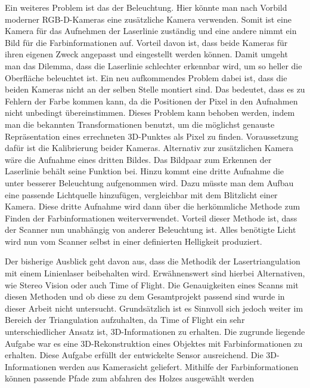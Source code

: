 	Ein weiteres Problem ist das der Beleuchtung. Hier könnte man nach Vorbild moderner RGB-D-Kameras eine zusätzliche Kamera verwenden. Somit ist eine Kamera für das Aufnehmen der Laserlinie zuständig und eine andere nimmt ein Bild für die Farbinformationen auf. Vorteil davon ist, dass beide Kameras für ihren eigenen Zweck angepasst und eingestellt werden können. Damit umgeht man das Dilemma, dass die Laserlinie schlechter erkennbar wird, um so heller die Oberfläche beleuchtet ist. Ein neu aufkommendes Problem dabei ist, dass die beiden Kameras nicht an der selben Stelle montiert sind. Das bedeutet, dass es zu Fehlern der Farbe kommen kann, da die Positionen der Pixel in den Aufnahmen nicht unbedingt übereinstimmen. Dieses Problem kann behoben werden, indem man die bekannten Transformationen benutzt, um die möglichst genauste Repräsentation eines errechneten 3D-Punktes als Pixel zu finden. Voraussetzung dafür ist die Kalibrierung beider Kameras. Alternativ zur zusätzlichen Kamera wäre die Aufnahme eines dritten Bildes. Das Bildpaar zum Erkennen der Laserlinie behält seine Funktion bei. Hinzu kommt eine dritte Aufnahme die unter besserer Beleuchtung aufgenommen wird. Dazu müsste man dem Aufbau eine passende Lichtquelle hinzufügen, vergleichbar mit dem Blitzlicht einer Kamera. Diese dritte Aufnahme wird dann über die herkömmliche Methode zum Finden der Farbinformationen weiterverwendet. Vorteil dieser Methode ist, dass der Scanner nun unabhängig von anderer Beleuchtung ist. Alles benötigte Licht wird nun vom Scanner selbst in einer definierten Helligkeit produziert.
	
	Der bisherige Ausblick geht davon aus, dass die Methodik der Lasertriangulation mit einem Linienlaser beibehalten wird. Erwähnenswert sind hierbei Alternativen, wie Stereo Vision oder auch Time of Flight. Die Genauigkeiten eines Scanns mit diesen Methoden und ob diese zu dem Gesamtprojekt passend sind wurde in dieser Arbeit nicht untersucht. Grundsätzlich ist es Sinnvoll sich jedoch weiter im Bereich der Triangulation aufzuhalten, da Time of Flight ein sehr unterschiedlicher Ansatz ist, 3D-Informationen zu erhalten. \newline
	Die zugrunde liegende Aufgabe war es eine 3D-Rekonstruktion eines Objektes mit Farbinformationen zu erhalten. Diese Aufgabe erfüllt der entwickelte Sensor ausreichend. Die 3D-Informationen werden aus Kamerasicht geliefert. Mithilfe der Farbinformationen können passende Pfade zum abfahren des Holzes ausgewählt werden